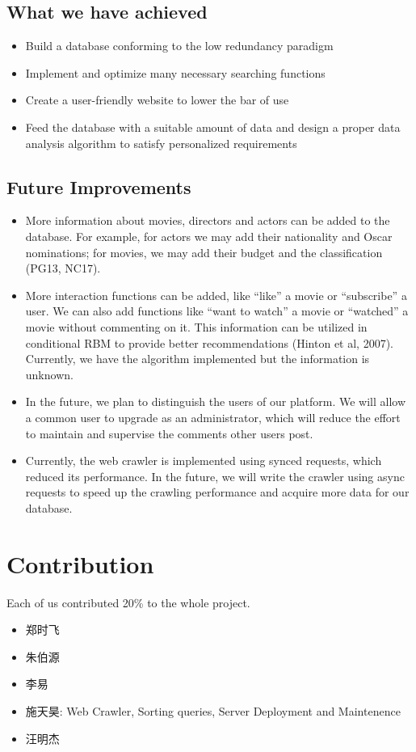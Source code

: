 \begin{CJK*}{UTF8}{gbsn}
\subsection{What we have achieved}
\begin{itemize}
\item Build a database conforming to the low redundancy paradigm
\item Implement and optimize many necessary  searching functions
\item Create a user-friendly website to lower the bar of use
\item Feed the database with a suitable amount of data and design a proper data analysis algorithm to satisfy personalized requirements
\end{itemize}
\subsection{Future Improvements}
\begin{itemize}
\item More information about movies, directors and actors can be added to the database. For example, for actors we may add their nationality and Oscar nominations; for movies, we may add their budget and the classification (PG13, NC17).
\item More interaction functions can be added, like ``like'' a movie or ``subscribe'' a user. We can also add functions like ``want to watch'' a movie or ``watched'' a movie without commenting on it. This information can be utilized in conditional RBM to provide better recommendations (Hinton et al, 2007). Currently, we have the algorithm implemented but the information is unknown. 
\item In the future, we plan to distinguish the users of our platform. We will allow a common user to upgrade as an administrator, which will reduce the effort to maintain and supervise the comments other users post.
\item Currently, the web crawler is implemented using synced requests, which reduced its performance. In the future, we will write the crawler using async requests to speed up the crawling performance and acquire more data for our database.
\end{itemize}

\section{Contribution}
Each of us contributed 20\% to the whole project.
\begin{itemize}
    \item 郑时飞
    \item 朱伯源
    \item 李易
    \item 施天昊:    Web Crawler, Sorting queries, Server Deployment and Maintenence
    \item 汪明杰
\end{itemize}

\end{CJK*}
